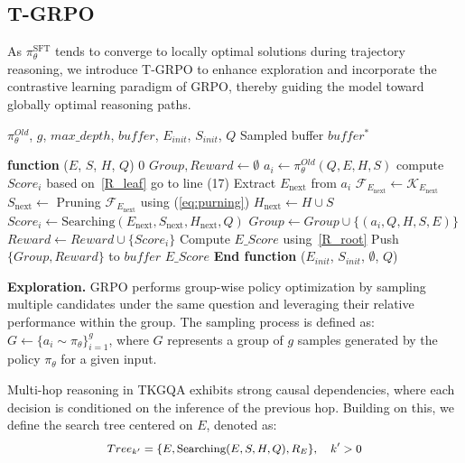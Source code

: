 \documentclass[letterpaper]{article} %
\begin{document}
\subsection{T-GRPO} 
As $\pi_{\theta}^{\mathrm{SFT}}$ tends to converge to locally optimal solutions during trajectory reasoning, we introduce T-GRPO to enhance exploration and incorporate the contrastive learning paradigm of GRPO, thereby guiding the model toward globally optimal reasoning paths.
\begin{algorithm}
\caption{Tree-group Searching}
\label{alg:tree_group_search}
\label{alg:searching}
\begin{algorithmic}[1]
\Require $\pi_\theta^{Old}$, $g$, $max\_depth$, $buf\!fer$, $E_{init}$, $S_{init}$, $Q$
\Ensure Sampled buffer $buf\!fer^*$

\State \textbf{function} ($E$, $S$, $H$, $Q$)
    \State \Return $0$
\EndIf
\State $Group,Reward \gets \emptyset$
    \State $a_i \gets \pi_\theta^{Old}(Q, E, H, S)$ 
        \State compute $Score_i$ based on~\eqref{R_leaf}
        \State go to line (17)
    \EndIf
    \State Extract $E_\text{next}$ from $a_i$
    \State $\mathcal{F}_{E_\text{next}} \gets \mathcal{K}_{E_\text{next}}$ 
    \State $S_\text{next} \gets$ Pruning $\mathcal{F}_{E_\text{next}}$ using (\ref{eq:purning})
    \State $H_\text{next} \gets H \cup S$
    \State $Score_i \gets \text{Searching}(E_{\text{next}}, S_{\text{next}}, H_\text{next}, Q)$
    \State $Group \gets Group \cup \{(a_i, Q, H, S,E)\}$
    \State $Reward \gets Reward \cup \{Score_i\}$
\EndFor
\State Compute $E\_Score$ using~\eqref{R_root}
\State Push $\{Group, Reward\}$ to $buf\!fer$  
\State \Return $E\_Score$
\State \textbf{End function}
\State  {}($E_{init}$, $S_{init}$, $\emptyset$, $Q$)
\end{algorithmic}
\end{algorithm}

\noindent\textbf{Exploration.} GRPO performs group-wise policy optimization by sampling multiple candidates under the same question and leveraging their relative performance within the group. The sampling process is defined as: $ G \gets \{ a_i \sim \pi_\theta \}_{i=1}^{g}$, where $G$ represents a group of $g$ samples generated by the policy $\pi_\theta$ for a given input.

Multi-hop reasoning in TKGQA exhibits strong causal dependencies, where each decision is conditioned on the inference of the previous hop. Building on this, we define the search tree centered on $E$, denoted as:
\begin{equation}  \small
	\begin{aligned}  
        Tree_{k'} = \{E,\text{Searching}(E,S,H,Q),R_E\} ,\quad k' > 0
	\end{aligned} 
    \label{group}
\end{equation} 
\end{document}
